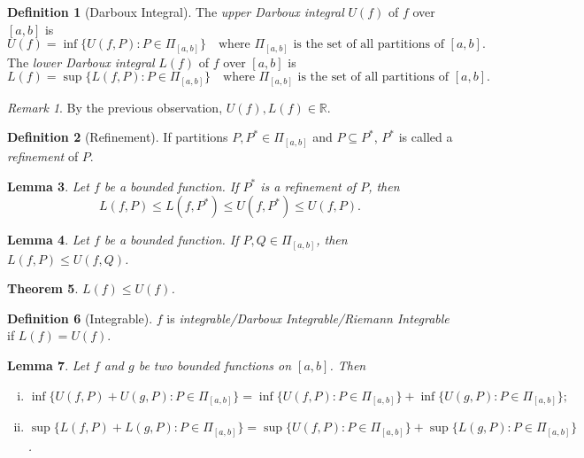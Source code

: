 \documentclass[12pt, lettersize]{book}
\theoremstyle{plain}
\newtheorem{thm}{Theorem}[section]
\newtheorem{lem}[thm]{Lemma}
\theoremstyle{definition}
\newtheorem{dfn}[thm]{Definition}
\theoremstyle{remark}
\newtheorem*{rem}{Remark}
\newcommand{\R}{\mathbb{R}}
\begin{document}
	\begin{dfn}[Darboux Integral]
		The \emph{upper Darboux integral} $U(f)$ of $f$ over $[a,b]$ is
		\begin{displaymath}
			U(f)=\inf\{U(f,P):P\in\Pi_{[a,b]}\}\quad\text{where $\Pi_{[a,b]}$ is the set of all partitions of $[a,b]$}.
		\end{displaymath}
		The \emph{lower Darboux integral} $L(f)$ of $f$ over $[a,b]$ is
		\begin{displaymath}
			L(f)=\sup\{L(f,P):P\in\Pi_{[a,b]}\}\quad\text{where $\Pi_{[a,b]}$ is the set of all partitions of $[a,b]$}.
		\end{displaymath}
	\end{dfn}
	\begin{rem}
		By the previous observation, $U(f),L(f)\in\R$. 
	\end{rem}
	
	\begin{dfn}[Refinement]
		If partitions $P,P^\ast\in\Pi_{[a,b]}$ and $P\subseteq P^\ast$, $P^\ast$ is called a \emph{refinement} of $P$.
	\end{dfn}
	
	\begin{lem}
		Let $f$ be a bounded function. If $P^\ast$ is a refinement of $P$, then
		\begin{displaymath}
			L(f,P)\leq L(f,P^\ast)\leq U(f,P^\ast)\leq U(f,P).
		\end{displaymath}
	\end{lem}
	
	\begin{lem}
		Let $f$ be a bounded function. If $P,Q\in\Pi_{[a,b]}$, then $L(f,P)\leq U(f,Q)$. 
	\end{lem}
	
	\begin{thm}
		$L(f)\leq U(f)$. 
	\end{thm}
	
	\begin{dfn}[Integrable]
		$f$ is \emph{integrable/Darboux Integrable/Riemann Integrable} if $L(f)=U(f)$. 
	\end{dfn}
	
	\begin{lem}
		Let $f$ and $g$ be two bounded functions on $[a,b]$. Then
		\begin{enumerate}[(i)]
			\item $\inf\{U(f,P)+U(g,P): P\in\Pi_{[a,b]}\} = \inf\{U(f,P): P\in\Pi_{[a,b]}\}+\inf\{U(g,P): P\in\Pi_{[a,b]}\};$   
			\item $\sup\{L(f,P)+L(g,P): P\in\Pi_{[a,b]}\} = \sup\{U(f,P): P\in\Pi_{[a,b]}\}+\sup\{L(g,P): P\in\Pi_{[a,b]}\}$.
		\end{enumerate}
	\end{lem}
	
\end{document}
